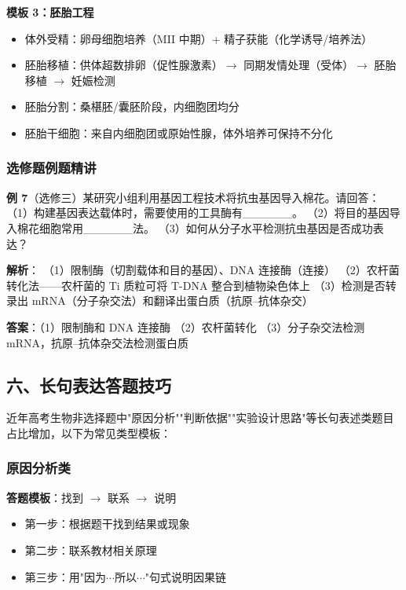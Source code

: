 \textbf{模板 3：胚胎工程}

\begin{itemize}
  \item 体外受精：卵母细胞培养（MII 中期）+ 精子获能（化学诱导/培养法）
  \item 胚胎移植：供体超数排卵（促性腺激素）$\to$ 同期发情处理（受体）$\to$ 胚胎移植 $\to$ 妊娠检测
  \item 胚胎分割：桑椹胚/囊胚阶段，内细胞团均分
  \item 胚胎干细胞：来自内细胞团或原始性腺，体外培养可保持不分化
\end{itemize}

\subsubsection{选修题例题精讲}

\textbf{例 7}（选修三）某研究小组利用基因工程技术将抗虫基因导入棉花。请回答：
（1）构建基因表达载体时，需要使用的工具酶有\_\_\_\_\_\_。
（2）将目的基因导入棉花细胞常用\_\_\_\_\_\_法。
（3）如何从分子水平检测抗虫基因是否成功表达？

\textbf{解析}：
（1）限制酶（切割载体和目的基因）、DNA 连接酶（连接）
（2）农杆菌转化法——农杆菌的 Ti 质粒可将 T-DNA 整合到植物染色体上
（3）检测是否转录出 mRNA（分子杂交法）和翻译出蛋白质（抗原--抗体杂交）

\textbf{答案}：（1）限制酶和 DNA 连接酶 （2）农杆菌转化 （3）分子杂交法检测 mRNA，抗原--抗体杂交法检测蛋白质

\subsection{六、长句表达答题技巧}

近年高考生物非选择题中"原因分析""判断依据""实验设计思路"等长句表述类题目占比增加，以下为常见类型模板：

\subsubsection{原因分析类}

\textbf{答题模板}：找到 $\to$ 联系 $\to$ 说明
\begin{itemize}
  \item 第一步：根据题干找到结果或现象
  \item 第二步：联系教材相关原理
  \item 第三步：用"因为$\cdots$所以$\cdots$"句式说明因果链
\end{itemize}

